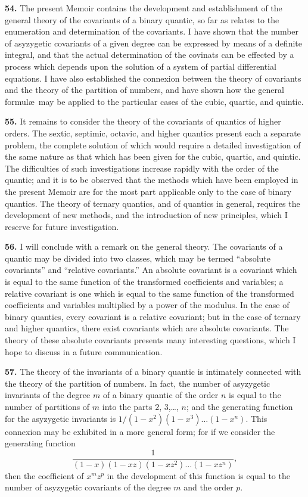 \documentclass[11pt,a4paper]{book}
\begin{document}
\clearpage
\setcounter{page}{270}

\textbf{54.} The present Memoir contains the development and establishment of the general theory of the covariants of a binary quantic, so far as relates to the enumeration and determination of the covariants. I have shown that the number of asyzygetic covariants of a given degree can be expressed by means of a definite integral, and that the actual determination of the covinats can be effected by a process which depends upon the solution of a system of partial differential equations. I have also established the connexion between the theory of covariants and the theory of the partition of numbers, and have shown how the general formul\ae\ may be applied to the particular cases of the cubic, quartic, and quintic.

\textbf{55.} It remains to consider the theory of the covariants of quantics of higher orders. The sextic, septimic, octavic, and higher quantics present each a separate problem, the complete solution of which would require a detailed investigation of the same nature as that which has been given for the cubic, quartic, and quintic. The difficulties of such investigations increase rapidly with the order of the quantic; and it is to be observed that the methods which have been employed in the present Memoir are for the most part applicable only to the case of binary quantics. The theory of ternary quantics, and of quantics in general, requires the development of new methods, and the introduction of new principles, which I reserve for future investigation.

\textbf{56.} I will conclude with a remark on the general theory. The covariants of a quantic may be divided into two classes, which may be termed ``absolute covariants'' and ``relative covariants.'' An absolute covariant is a covariant which is equal to the same function of the transformed coefficients and variables; a relative covariant is one which is equal to the same function of the transformed coefficients and variables multiplied by a power of the modulus. In the case of binary quantics, every covariant is a relative covariant; but in the case of ternary and higher quantics, there exist covariants which are absolute covariants. The theory of these absolute covariants presents many interesting questions, which I hope to discuss in a future communication.

\clearpage
\setcounter{page}{271}

\textbf{57.} The theory of the invariants of a binary quantic is intimately connected with the theory of the partition of numbers. In fact, the number of asyzygetic invariants of the degree $m$ of a binary quantic of the order $n$ is equal to the number of partitions of $m$ into the parts $2$, $3$,\ldots, $n$; and the generating function for the asyzygetic invariants is $1/(1-x^{2})(1-x^{3})\ldots(1-x^{n})$. This connexion may be exhibited in a more general form; for if we consider the generating function
\[
\frac{1}{(1-x)(1-xz)(1-xz^{2})\ldots(1-xz^{n})},
\]
then the coefficient of $x^{m}z^{p}$ in the development of this function is equal to the number of asyzygetic covariants of the degree $m$ and the order $p$.
\end{document}
